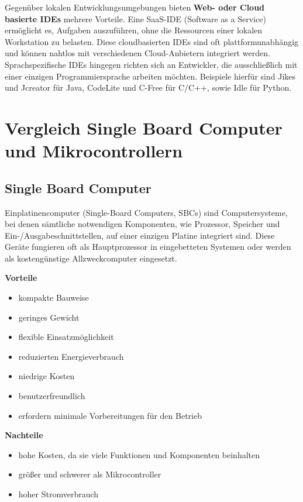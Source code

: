 Gegenüber lokalen Entwicklungsumgebungen bieten \textbf{Web- oder Cloud basierte IDEs} mehrere Vorteile. Eine SaaS-IDE (Software as a Service) ermöglicht es, Aufgaben auszuführen, ohne die Ressourcen einer lokalen Workstation zu belasten. Diese cloudbasierten IDEs sind oft plattformunabhängig und können nahtlos mit verschiedenen Cloud-Anbietern integriert werden.
Sprachspezifische IDEs hingegen richten sich an Entwickler, die ausschließlich mit einer einzigen Programmiersprache arbeiten möchten. Beispiele hierfür sind Jikes und Jcreator für Java, CodeLite und C-Free für C/C++, sowie Idle für Python. \parencite{integrierteEntwicklungsumgebung}


\newpage
\section{Vergleich Single Board Computer und Mikrocontrollern}
\subsection{Single Board Computer}
Einplatinencomputer (Single-Board Computers, SBCs) sind Computersysteme, bei denen sämtliche notwendigen Komponenten, wie Prozessor, Speicher und Ein-/Ausgabeschnittstellen, auf einer einzigen Platine integriert sind. Diese Geräte fungieren oft als Hauptprozessor in eingebetteten Systemen oder werden als kostengünstige Allzweckcomputer eingesetzt.

\textbf{Vorteile}
\begin{itemize}
	\item kompakte Bauweise
	\item geringes Gewicht
	\item flexible Einsatzmöglichkeit
	\item reduzierten Energieverbrauch 
	\item niedrige Kosten
	\item benutzerfreundlich
	\item erfordern minimale Vorbereitungen für den Betrieb
\end{itemize}

\textbf{Nachteile}
\begin{itemize}
	\item hohe Kosten, da sie viele Funktionen und Komponenten beinhalten
	\item größer und schwerer als Mikrocontroller
	\item hoher Stromverbrauch
\end{itemize}

